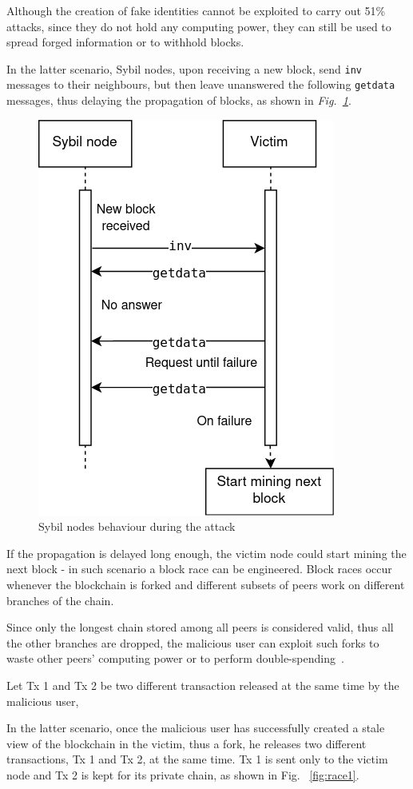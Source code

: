 \documentclass[12pt, letterpaper, twoside]{article}
\begin{document}
Although the creation of fake identities cannot be exploited to carry out 51\% attacks, since they do not hold any computing power, they can still be used to spread forged information or to withhold blocks.

In the latter scenario, Sybil nodes, upon receiving a new block, send \texttt{inv} messages to their neighbours, but then leave unanswered the following \texttt{getdata} messages, thus delaying the propagation of blocks, as shown in \emph{Fig.~\ref{fig:sybil}}.

\begin{figure}[h!]
	\includegraphics[width=.4\textwidth]{pict/sybil.png}
	\centering
	\caption{Sybil nodes behaviour during the attack}
	\label{fig:sybil}
\end{figure}

If the propagation is delayed long enough, the victim node could start mining the next block - in such scenario a block race can be engineered. Block races occur whenever the blockchain is forked and different subsets of peers work on different branches of the chain.

Since only the longest chain stored among all peers is considered valid, thus all the other branches are dropped, the malicious user can exploit such forks to waste other peers' computing power or to perform double-spending~\cite{zhang-ds-sybil}.

Let Tx 1 and Tx 2 be two different transaction released at the same time by the malicious user,  

In the latter scenario, once the malicious user has successfully created a stale view of the blockchain in the victim, thus a fork, he releases two different transactions, Tx 1 and Tx 2, at the same time. Tx 1 is sent only to the victim node and Tx 2 is kept for its private chain, as shown in Fig. ~\ref{fig:race1}.
\end{document}

